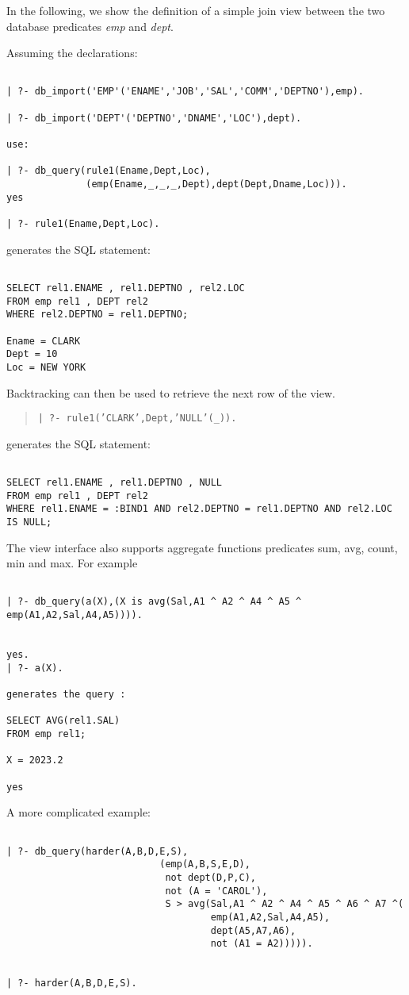 In the following, we show the definition of a simple join view between the 
two database predicates {\it emp} and {\it dept}.

Assuming the declarations:
\begin{verbatim}

| ?- db_import('EMP'('ENAME','JOB','SAL','COMM','DEPTNO'),emp).

| ?- db_import('DEPT'('DEPTNO','DNAME','LOC'),dept).

use:
	
| ?- db_query(rule1(Ename,Dept,Loc),
	          (emp(Ename,_,_,_,Dept),dept(Dept,Dname,Loc))).
yes

| ?- rule1(Ename,Dept,Loc).
\end{verbatim}

generates the SQL statement:
\begin{verbatim}

SELECT rel1.ENAME , rel1.DEPTNO , rel2.LOC
FROM emp rel1 , DEPT rel2
WHERE rel2.DEPTNO = rel1.DEPTNO;

Ename = CLARK
Dept = 10
Loc = NEW YORK
\end{verbatim}

Backtracking can then be used to retrieve the next row of the view.
\begin{quote}

{\tt | ?- rule1('CLARK',Dept,'NULL'(\_)).}
\end{quote}

generates the SQL statement:
\begin{verbatim}

SELECT rel1.ENAME , rel1.DEPTNO , NULL
FROM emp rel1 , DEPT rel2
WHERE rel1.ENAME = :BIND1 AND rel2.DEPTNO = rel1.DEPTNO AND rel2.LOC IS NULL;
\end{verbatim}

The view interface also supports aggregate functions predicates sum, avg,
count, min and max.  For example
\begin{verbatim}

| ?- db_query(a(X),(X is avg(Sal,A1 ^ A2 ^ A4 ^ A5 ^ emp(A1,A2,Sal,A4,A5)))).


yes.
| ?- a(X).

generates the query :

SELECT AVG(rel1.SAL)
FROM emp rel1;

X = 2023.2

yes
\end{verbatim}


A more complicated example:
\begin{verbatim}

| ?- db_query(harder(A,B,D,E,S), 
                           (emp(A,B,S,E,D),
                            not dept(D,P,C), 
                            not (A = 'CAROL'),
                            S > avg(Sal,A1 ^ A2 ^ A4 ^ A5 ^ A6 ^ A7 ^(
                                    emp(A1,A2,Sal,A4,A5),
                                    dept(A5,A7,A6),
                                    not (A1 = A2))))).


| ?- harder(A,B,D,E,S).
\end{verbatim}


